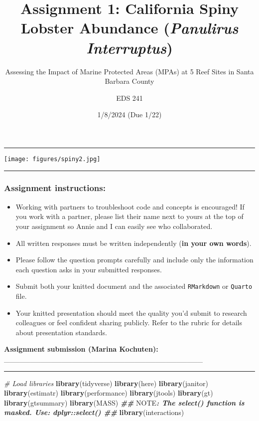 \documentclass[
]{article}
\title{Assignment 1: California Spiny Lobster Abundance (\emph{Panulirus
Interruptus})}
\subtitle{Assessing the Impact of Marine Protected Areas (MPAs) at 5
Reef Sites in Santa Barbara County}
\author{EDS 241}
\date{1/8/2024 (Due 1/22)}
\newenvironment{Shaded}{\begin{snugshade}}{\end{snugshade}}
\newcommand{\AlertTok}[1]{\textcolor[rgb]{0.94,0.16,0.16}{#1}}
\newcommand{\CommentTok}[1]{\textcolor[rgb]{0.56,0.35,0.01}{\textit{#1}}}
\newcommand{\DocumentationTok}[1]{\textcolor[rgb]{0.56,0.35,0.01}{\textbf{\textit{#1}}}}
\newcommand{\FunctionTok}[1]{\textcolor[rgb]{0.13,0.29,0.53}{\textbf{#1}}}
\newcommand{\NormalTok}[1]{#1}
\begin{document}
\maketitle

\begin{center}\rule{0.5\linewidth}{0.5pt}\end{center}

\texttt{[image: figures/spiny2.jpg]}

\begin{center}\rule{0.5\linewidth}{0.5pt}\end{center}

\subsubsection{Assignment instructions:}\label{assignment-instructions}

\begin{itemize}
\item
  Working with partners to troubleshoot code and concepts is encouraged!
  If you work with a partner, please list their name next to yours at
  the top of your assignment so Annie and I can easily see who
  collaborated.
\item
  All written responses must be written independently (\textbf{in your
  own words}).
\item
  Please follow the question prompts carefully and include only the
  information each question asks in your submitted responses.
\item
  Submit both your knitted document and the associated
  \texttt{RMarkdown} or \texttt{Quarto} file.
\item
  Your knitted presentation should meet the quality you'd submit to
  research colleagues or feel confident sharing publicly. Refer to the
  rubric for details about presentation standards.
\end{itemize}

\textbf{Assignment submission (Marina Kochuten):}
\_\_\_\_\_\_\_\_\_\_\_\_\_\_\_\_\_\_\_\_\_\_\_\_\_\_\_\_\_\_\_\_\_\_\_\_\_\_

\begin{center}\rule{0.5\linewidth}{0.5pt}\end{center}

\begin{Shaded}
\begin{Highlighting}[]
\CommentTok{\# Load libraries}
\FunctionTok{library}\NormalTok{(tidyverse)}
\FunctionTok{library}\NormalTok{(here)}
\FunctionTok{library}\NormalTok{(janitor)}
\FunctionTok{library}\NormalTok{(estimatr)  }
\FunctionTok{library}\NormalTok{(performance)}
\FunctionTok{library}\NormalTok{(jtools)}
\FunctionTok{library}\NormalTok{(gt)}
\FunctionTok{library}\NormalTok{(gtsummary)}
\FunctionTok{library}\NormalTok{(MASS) }\DocumentationTok{\#\# }\AlertTok{NOTE}\DocumentationTok{: The \textasciigrave{}select()\textasciigrave{} function is masked. Use: \textasciigrave{}dplyr::select()\textasciigrave{} \#\#}
\FunctionTok{library}\NormalTok{(interactions) }
\end{Highlighting}
\end{Shaded}
\end{document}
